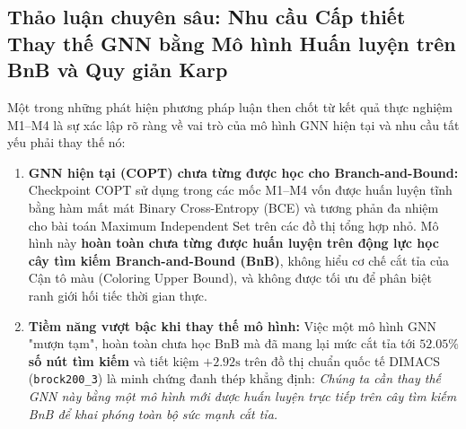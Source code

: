 \documentclass[11pt,a4paper]{article}
\begin{document}
\subsection{Thảo luận chuyên sâu: Nhu cầu Cấp thiết Thay thế GNN bằng Mô hình Huấn luyện trên BnB và Quy giản Karp}
Một trong những phát hiện phương pháp luận then chốt từ kết quả thực nghiệm M1--M4 là sự xác lập rõ ràng về vai trò của mô hình GNN hiện tại và nhu cầu tất yếu phải thay thế nó:
\begin{enumerate}[leftmargin=*]
    \item \textbf{GNN hiện tại (COPT) chưa từng được học cho Branch-and-Bound:} Checkpoint COPT sử dụng trong các mốc M1--M4 vốn được huấn luyện tĩnh bằng hàm mất mát Binary Cross-Entropy (BCE) và tương phản đa nhiệm cho bài toán Maximum Independent Set trên các đồ thị tổng hợp nhỏ. Mô hình này \textbf{hoàn toàn chưa từng được huấn luyện trên động lực học cây tìm kiếm Branch-and-Bound (BnB)}, không hiểu cơ chế cắt tỉa của Cận tô màu (Coloring Upper Bound), và không được tối ưu để phân biệt ranh giới hối tiếc thời gian thực.
    \item \textbf{Tiềm năng vượt bậc khi thay thế mô hình:} Việc một mô hình GNN "mượn tạm", hoàn toàn chưa học BnB mà đã mang lại mức cắt tỉa tới \textbf{$52.05\%$ số nút tìm kiếm} và tiết kiệm $+2.92\text{s}$ trên đồ thị chuẩn quốc tế DIMACS (\texttt{brock200\_3}) là minh chứng đanh thép khẳng định: \textit{Chúng ta cần thay thế GNN này bằng một mô hình mới được huấn luyện trực tiếp trên cây tìm kiếm BnB để khai phóng toàn bộ sức mạnh cắt tỉa.}
\end{enumerate}
\end{document}
